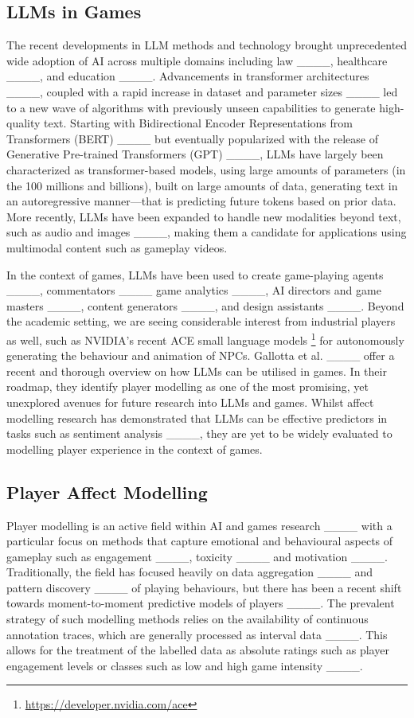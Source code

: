 \subsection{LLMs in Games}

The recent developments in LLM methods and technology 
brought unprecedented wide adoption of AI across multiple domains including law ____, healthcare ____, and education ____. Advancements in transformer architectures ____, coupled with a rapid increase in dataset and parameter sizes ____ led to a new wave of algorithms with previously unseen capabilities to generate high-quality text. Starting with Bidirectional Encoder Representations from Transformers (BERT) ____ but eventually popularized with the release of Generative Pre-trained Transformers (GPT) ____, LLMs have largely been characterized as transformer-based models, using large amounts of parameters (in the 100 millions and billions), built on large amounts of data, generating text in an autoregressive manner---that is predicting future tokens based on prior data. More recently, LLMs have been expanded to handle new modalities beyond text, such as audio and images ____, making them a candidate for applications using multimodal content such as gameplay videos.

In the context of games, LLMs have been used to create game-playing agents ____, commentators ____ game analytics ____, AI directors and game masters ____, content generators ____, and design assistants ____. 
% 
Beyond the academic setting, we are seeing considerable interest from industrial players as well, such as NVIDIA's recent ACE small language models \footnote{\url{https://developer.nvidia.com/ace}} for autonomously generating the behaviour and animation of NPCs. 
% 
Gallotta et al. ____ offer a recent and thorough overview on how LLMs can be utilised in games. In their roadmap, they identify player modelling as one of the most promising, yet unexplored avenues for future research into LLMs and games. Whilst affect modelling research has demonstrated that LLMs can be effective predictors in tasks such as sentiment analysis ____, they are yet to be widely evaluated to modelling player experience in the context of games. 

\subsection{Player Affect Modelling}

Player modelling is an active field within AI and games research ____ with a particular focus on methods that capture emotional and behavioural aspects of gameplay such as engagement ____, toxicity ____ and motivation ____. Traditionally, the field has focused heavily on data aggregation ____ and pattern discovery ____ of playing behaviours, but there has been a recent shift towards moment-to-moment predictive models of players 
____. The prevalent strategy of such modelling methods relies on the availability of continuous annotation traces, which are generally processed as interval data ____. This allows for the treatment of the labelled data as absolute ratings such as player engagement levels or classes such as low and high game intensity ____.

